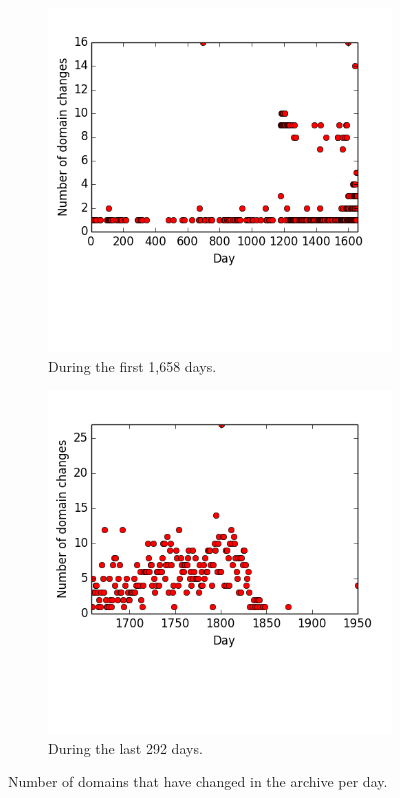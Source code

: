 \documentclass[11pt]{article}
\def \iostarted {1,658}
\def \afterio {292}
\begin{document}
    \begin{figure}
    \centering
    \begin{subfigure}{.5\textwidth}
      \centering
      \includegraphics[width=\linewidth]{images/domain_changes_per_day_first.png}
      \caption{During the first \iostarted{} days.}
    \end{subfigure}%
    \begin{subfigure}{.5\textwidth}
      \centering
      \includegraphics[width=\linewidth]{images/domain_changes_per_day_last.png}
      \caption{During the last \afterio{} days.}
    \end{subfigure}
    \caption{Number of domains that have changed in the archive per day.}
    \label{fig:domain_changes_per_day}
    \end{figure}
\end{document}
